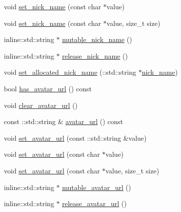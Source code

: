\begin{DoxyCompactItemize}
\item 
void \hyperlink{class_i_m_1_1_base_define_1_1_server_user_info_ac96e171ece7160994872077896c9ff29}{set\+\_\+nick\+\_\+name} (const char $\ast$value)
\item 
void \hyperlink{class_i_m_1_1_base_define_1_1_server_user_info_a3beb11e03a5b6e2ea82fb4af48657a34}{set\+\_\+nick\+\_\+name} (const char $\ast$value, size\+\_\+t size)
\item 
inline\+::std\+::string $\ast$ \hyperlink{class_i_m_1_1_base_define_1_1_server_user_info_a7fd72bb3f80ce70c6836b8f2fdb23d8f}{mutable\+\_\+nick\+\_\+name} ()
\item 
inline\+::std\+::string $\ast$ \hyperlink{class_i_m_1_1_base_define_1_1_server_user_info_a913ad6e1ffa1e9b212afa5b47de689f4}{release\+\_\+nick\+\_\+name} ()
\item 
void \hyperlink{class_i_m_1_1_base_define_1_1_server_user_info_ae82d00b8312846a036946edd620dcb95}{set\+\_\+allocated\+\_\+nick\+\_\+name} (\+::std\+::string $\ast$\hyperlink{class_i_m_1_1_base_define_1_1_server_user_info_a521f26d05e7b0a812021060a2f0ba57b}{nick\+\_\+name})
\item 
bool \hyperlink{class_i_m_1_1_base_define_1_1_server_user_info_a166fd8672b98c7d627e82064d2afa2c9}{has\+\_\+avatar\+\_\+url} () const 
\item 
void \hyperlink{class_i_m_1_1_base_define_1_1_server_user_info_afdc738c325c290f9b034994e61489ab6}{clear\+\_\+avatar\+\_\+url} ()
\item 
const \+::std\+::string \& \hyperlink{class_i_m_1_1_base_define_1_1_server_user_info_af935bca8e0fcfc75e5890f5299464f83}{avatar\+\_\+url} () const 
\item 
void \hyperlink{class_i_m_1_1_base_define_1_1_server_user_info_ab16d94c8313f4beb2d511f6d8ac588b8}{set\+\_\+avatar\+\_\+url} (const \+::std\+::string \&value)
\item 
void \hyperlink{class_i_m_1_1_base_define_1_1_server_user_info_a0bb002f9256e564a33ad524aa76bdf7a}{set\+\_\+avatar\+\_\+url} (const char $\ast$value)
\item 
void \hyperlink{class_i_m_1_1_base_define_1_1_server_user_info_a0ee6f4af0484a098c39c832524f39adf}{set\+\_\+avatar\+\_\+url} (const char $\ast$value, size\+\_\+t size)
\item 
inline\+::std\+::string $\ast$ \hyperlink{class_i_m_1_1_base_define_1_1_server_user_info_a7a0bbf1ce3b984112edc1f9dc249cc4b}{mutable\+\_\+avatar\+\_\+url} ()
\item 
inline\+::std\+::string $\ast$ \hyperlink{class_i_m_1_1_base_define_1_1_server_user_info_aaa7d8c9cc7b52fb44bd9b9672c47f7cb}{release\+\_\+avatar\+\_\+url} ()

\end{DoxyCompactItemize}
